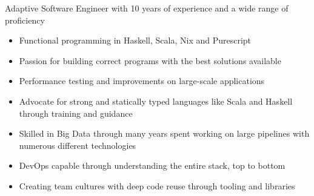 

\begin{cvparagraph}


Adaptive Software Engineer with 10 years of experience and a wide range of proficiency
\begin{itemize}
  \setlength\itemsep{-0.7em}
  \item{Functional programming in Haskell, Scala, Nix and Purescript}
  \item{Passion for building correct programs with the best solutions available}
  \item{Performance testing and improvements on large-scale applications}
  \item{Advocate for strong and statically typed languages like Scala and Haskell through training and guidance}
  \item{Skilled in Big Data through many years spent working on large pipelines with numerous different technologies}
  \item{DevOps capable through understanding the entire stack, top to bottom}
  \item{Creating team cultures with deep code reuse through tooling and libraries}
  \vspace*{-\baselineskip}
\end{itemize}
\end{cvparagraph}
